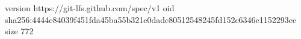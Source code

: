version https://git-lfs.github.com/spec/v1
oid sha256:4444e84039f451fda45ba55b321e0dadc80512548245fd152c6346e1152293ee
size 772

